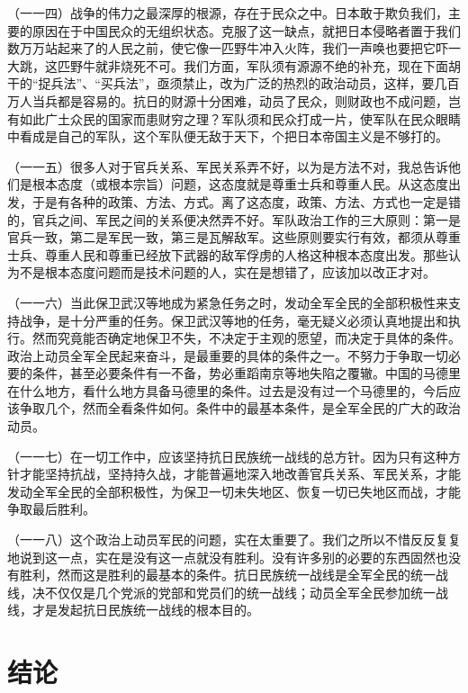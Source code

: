 （一一四）战争的伟力之最深厚的根源，存在于民众之中。日本敢于欺负我们，主要的原因在于中国民众的无组织状态。克服了这一缺点，就把日本侵略者置于我们数万万站起来了的人民之前，使它像一匹野牛冲入火阵，我们一声唤也要把它吓一大跳，这匹野牛就非烧死不可。我们方面，军队须有源源不绝的补充，现在下面胡干的“捉兵法”、“买兵法”，亟须禁止，改为广泛的热烈的政治动员，这样，要几百万人当兵都是容易的。抗日的财源十分困难，动员了民众，则财政也不成问题，岂有如此广土众民的国家而患财穷之理？军队须和民众打成一片，使军队在民众眼睛中看成是自己的军队，这个军队便无敌于天下，个把日本帝国主义是不够打的。

（一一五）很多人对于官兵关系、军民关系弄不好，以为是方法不对，我总告诉他们是根本态度（或根本宗旨）问题，这态度就是尊重士兵和尊重人民。从这态度出发，于是有各种的政策、方法、方式。离了这态度，政策、方法、方式也一定是错的，官兵之间、军民之间的关系便决然弄不好。军队政治工作的三大原则：第一是官兵一致，第二是军民一致，第三是瓦解敌军。这些原则要实行有效，都须从尊重士兵、尊重人民和尊重已经放下武器的敌军俘虏的人格这种根本态度出发。那些认为不是根本态度问题而是技术问题的人，实在是想错了，应该加以改正才对。

（一一六）当此保卫武汉等地成为紧急任务之时，发动全军全民的全部积极性来支持战争，是十分严重的任务。保卫武汉等地的任务，毫无疑义必须认真地提出和执行。然而究竟能否确定地保卫不失，不决定于主观的愿望，而决定于具体的条件。政治上动员全军全民起来奋斗，是最重要的具体的条件之一。不努力于争取一切必要的条件，甚至必要条件有一不备，势必重蹈南京等地失陷之覆辙。中国的马德里在什么地方，看什么地方具备马德里的条件。过去是没有过一个马德里的，今后应该争取几个，然而全看条件如何。条件中的最基本条件，是全军全民的广大的政治动员。

（一一七）在一切工作中，应该坚持抗日民族统一战线的总方针。因为只有这种方针才能坚持抗战，坚持持久战，才能普遍地深入地改善官兵关系、军民关系，才能发动全军全民的全部积极性，为保卫一切未失地区、恢复一切已失地区而战，才能争取最后胜利。

（一一八）这个政治上动员军民的问题，实在太重要了。我们之所以不惜反反复复地说到这一点，实在是没有这一点就没有胜利。没有许多别的必要的东西固然也没有胜利，然而这是胜利的最基本的条件。抗日民族统一战线是全军全民的统一战线，决不仅仅是几个党派的党部和党员们的统一战线；动员全军全民参加统一战线，才是发起抗日民族统一战线的根本目的。

\section{结论}

